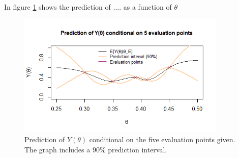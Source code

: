 In figure \ref{2afiveeval} shows the prediction of .... as a function of $\theta$ 

\begin{figure}
    \centering
    \includegraphics[width=100mm]{2anew.png}
    \caption{Prediction of $Y(\theta)$ conditional on the five evaluation points given. The graph includes a $90\%$ prediction interval. }
    \label{2afiveeval}
\end{figure}
